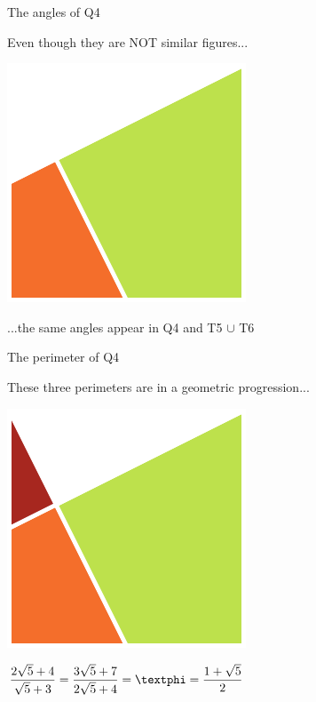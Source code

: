 \documentclass[14pt]{beamer}
\begin{document}
    \begin{frame}{The angles of Q4}
        \begin{center}
            Even though they are NOT similar figures...
        \end{center}
        \hspace{6.18em} \includegraphics[scale=1.0]{figures/figure001g.pdf} \\
        \begin{center}
            ...the same angles appear in Q4 and T5 $\cup$ T6
        \end{center}
    \end{frame}


    \begin{frame}{The perimeter of Q4}
        \begin{center}
            These three perimeters are in a geometric progression...
        \end{center}
        \hspace{6.18em} \includegraphics[scale=1.0]{figures/figure001h.pdf} \\
        \begin{center}
            \vspace{-1.3ex}%
            $\displaystyle\frac{2\sqrt{5} + 4}{\sqrt{5} + 3} = \frac{3\sqrt{5} + 7}{2\sqrt{5} + 4} = \text{\textphi} = \frac{1+\sqrt{5}}{2}$
            \vspace{-1.3ex}
        \end{center}
    \end{frame}
\end{document}

